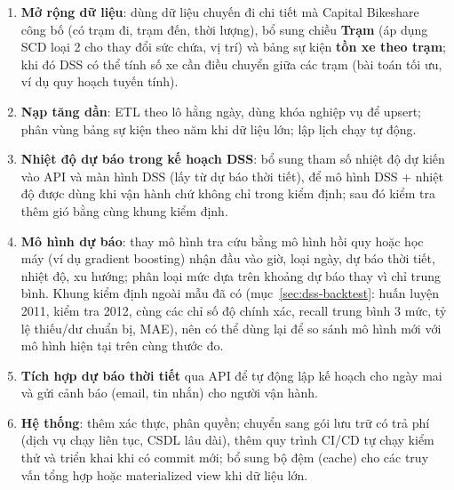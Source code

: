 \begin{enumerate}
    \item \textbf{Mở rộng dữ liệu}: dùng dữ liệu chuyến đi chi tiết mà Capital Bikeshare công bố (có trạm đi, trạm đến, thời lượng), bổ sung chiều \textbf{Trạm} (áp dụng SCD loại 2 cho thay đổi sức chứa, vị trí) và bảng sự kiện \textbf{tồn xe theo trạm}; khi đó DSS có thể tính số xe cần điều chuyển giữa các trạm (bài toán tối ưu, ví dụ quy hoạch tuyến tính).
    \item \textbf{Nạp tăng dần}: ETL theo lô hằng ngày, dùng khóa nghiệp vụ  để upsert; phân vùng bảng sự kiện theo năm khi dữ liệu lớn; lập lịch chạy tự động.
    \item \textbf{Nhiệt độ dự báo trong kế hoạch DSS}: bổ sung tham số nhiệt độ dự kiến vào API  và màn hình DSS (lấy từ dự báo thời tiết), để mô hình DSS + nhiệt độ được dùng khi vận hành chứ không chỉ trong kiểm định; sau đó kiểm tra thêm gió bằng cùng khung kiểm định.
    \item \textbf{Mô hình dự báo}: thay mô hình tra cứu bằng mô hình hồi quy hoặc học máy (ví dụ gradient boosting) nhận đầu vào giờ, loại ngày, dự báo thời tiết, nhiệt độ, xu hướng; phân loại mức dựa trên khoảng dự báo thay vì chỉ trung bình. Khung kiểm định ngoài mẫu đã có (mục~\ref{sec:dss-backtest}: huấn luyện 2011, kiểm tra 2012, cùng các chỉ số độ chính xác, recall trung bình 3 mức, tỷ lệ thiếu/dư chuẩn bị, MAE), nên có thể dùng lại để so sánh mô hình mới với mô hình hiện tại trên cùng thước đo.
    \item \textbf{Tích hợp dự báo thời tiết} qua API để tự động lập kế hoạch cho ngày mai và gửi cảnh báo (email, tin nhắn) cho người vận hành.
    \item \textbf{Hệ thống}: thêm xác thực, phân quyền; chuyển sang gói lưu trữ có trả phí (dịch vụ chạy liên tục, CSDL lâu dài), thêm quy trình CI/CD tự chạy kiểm thử và triển khai khi có commit mới; bổ sung bộ đệm (cache) cho các truy vấn tổng hợp hoặc materialized view khi dữ liệu lớn.
\end{enumerate}
